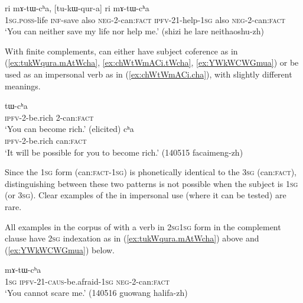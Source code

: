  \begin{exe}
\ex \label{ex:tukWqura.mAtWcha}
 \gll  [a-sroʁ kɤ-ri] ri mɤ-tɯ-cʰa, [tu-kɯ-qur-a] ri mɤ-tɯ-cʰa  \\
 \textsc{1sg}.\textsc{poss}-life \textsc{inf}-save also \textsc{neg}-2-can:\textsc{fact} \textsc{ipfv}-2\fl{}1-help-\textsc{1sg} also \textsc{neg}-2-can:\textsc{fact}  \\
 \glt `You can neither save my life nor help me.' (shizi he lare neithaoshu-zh)
\end{exe}    

With finite complements,  can either have subject coference as in (\ref{ex:tukWqura.mAtWcha}, \ref{ex:chWtWmACi.tWcha}, \ref{ex:YWkWCWGmua}) or be used as an impersonal verb as in (\ref{ex:chWtWmACi.cha}), with slightly different meanings.
   
\begin{exe}
 \ex
\begin{xlist}
\ex \label{ex:chWtWmACi.tWcha}
  tɯ-cʰa \\
 \textsc{ipfv}-2-be.rich 2-can:\textsc{fact} \\
 \glt `You can become rich.' (elicited)
 \ex \label{ex:chWtWmACi.cha}
  cʰa \\
 \textsc{ipfv}-2-be.rich can:\textsc{fact} \\
 \glt `It will be possible for you to become rich.' (140515 facaimeng-zh)
\end{xlist}
\end{exe}
  
 Since the \textsc{1sg} form  (can:\textsc{fact}-\textsc{1sg}) is phonetically identical to the \textsc{3sg}  (can:\textsc{fact}), distinguishing between these two patterns is not possible when the subject is \textsc{1sg} (or \textsc{3sg}). Clear examples of the  in impersonal use (where it can be tested) are rare.
 
All examples in the corpus of  with a verb in \textsc{2sg}\fl{}\textsc{1sg} form in the complement clause have \textsc{2sg} indexation as in (\ref{ex:tukWqura.mAtWcha}) above and (\ref{ex:YWkWCWGmua}) below.

\begin{exe}
\ex \label{ex:YWkWCWGmua}
 mɤ-tɯ-cʰa  \\  
  \textsc{1sg} \textsc{ipfv}-2\fl{}1-\textsc{caus}-be.afraid-\textsc{1sg} \textsc{neg}-2-can:\textsc{fact} \\
\glt `You cannot scare me.' (140516 guowang halifa-zh)
  \end{exe}


